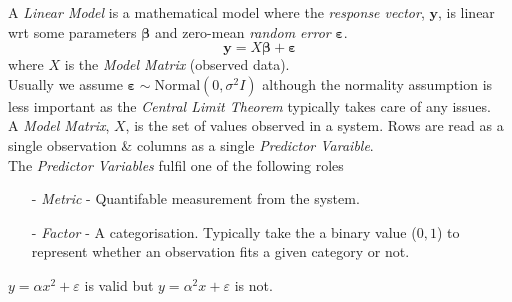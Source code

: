 \documentclass[11pt,a4paper]{article}
\begin{document}
A \textit{Linear Model} is a mathematical model where the \textit{response vector}, $\textbf{y}$, is linear wrt some parameters $\pmb\beta$ and zero-mean \textit{random error} $\pmb\varepsilon$.
$$\textbf{y}=X\pmb\beta+\pmb\varepsilon$$
where $X$ is the \textit{Model Matrix} (\ie observed data).\\
Usually we assume $\pmb\varepsilon\sim\text{Normal}(0,\sigma^2 I)$ although the normality assumption is less important as the \textit{Central Limit Theorem} typically takes care of any issues.\\

A \textit{Model Matrix}, $X$, is the set of values observed in a system. Rows are read as a single observation \& columns as a single \textit{Predictor Varaible}.\\
The \textit{Predictor Variables} fulfil one of the following roles
\begin{itemize}
	\item[-] \textit{Metric} - Quantifable measurement from the system.
	\item[-] \textit{Factor} - A categorisation. Typically take the a binary value ($0,1$) to represent whether an observation fits a given category or not.
\end{itemize}

$y=\alpha x^2+\varepsilon$ is valid but $y=\alpha^2x+\varepsilon$ is not.\\
\end{document}
